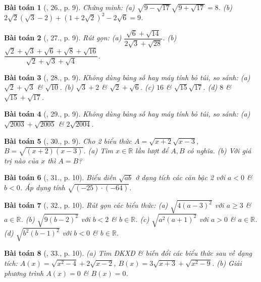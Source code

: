 \documentclass{article}
\newtheorem{baitoan}{Bài toán}
\begin{document}
\begin{baitoan}[\cite{SBT_Toan_9_tap_1}, 26., p. 9]
	Chứng minh: (a) $\sqrt{9 - \sqrt{17}}\sqrt{9 + \sqrt{17}} = 8$. (b) $2\sqrt{2}(\sqrt{3} - 2) + (1 + 2\sqrt{2})^2 - 2\sqrt{6} = 9$.
\end{baitoan}

\begin{baitoan}[\cite{SBT_Toan_9_tap_1}, 27., p. 9]
	Rút gọn: (a) $\dfrac{\sqrt{6} + \sqrt{14}}{2\sqrt{3} + \sqrt{28}}$. (b) $\dfrac{\sqrt{2} + \sqrt{3} + \sqrt{6} + \sqrt{8} + \sqrt{16}}{\sqrt{2} + \sqrt{3} + \sqrt{4}}$.
\end{baitoan}

\begin{baitoan}[\cite{SBT_Toan_9_tap_1}, 28., p. 9]
	Không dùng bảng số hay máy tính bỏ túi, so sánh: (a) $\sqrt{2} + \sqrt{3}$ \& $\sqrt{10}$. (b) $\sqrt{3} + 2$ \& $\sqrt{2} + \sqrt{6}$. (c) $16$ \& $\sqrt{15}\sqrt{17}$. (d) $8$ \& $\sqrt{15} + \sqrt{17}$.
\end{baitoan}

\begin{baitoan}[\cite{SBT_Toan_9_tap_1}, 29., p. 9]
	Không dùng bảng số hay máy tính bỏ túi, so sánh: (a) $\sqrt{2003} + \sqrt{2005}$ \& $2\sqrt{2004}$.
\end{baitoan}

\begin{baitoan}[\cite{SBT_Toan_9_tap_1}, 30., p. 9]
	Cho 2 biểu thức $A = \sqrt{x + 2}\sqrt{x - 3}$, $B = \sqrt{(x + 2)(x - 3)}$. (a) Tìm $x\in\mathbb{R}$ lần lượt để $A,B$  có nghĩa. (b) Với giá trị nào của $x$ thì $A = B$?
\end{baitoan}

\begin{baitoan}[\cite{SBT_Toan_9_tap_1}, 31., p. 10]
	Biểu diễn $\sqrt{ab}$ ở dạng tích các căn bậc 2 với $a < 0$ \& $b < 0$. Áp dụng tính $\sqrt{(-25)\cdot(-64)}$.
\end{baitoan}

\begin{baitoan}[\cite{SBT_Toan_9_tap_1}, 32., p. 10]
	Rút gọn các biểu thức: (a) $\sqrt{4(a - 3)^2}$ với $a\ge3$ \& $a\in\mathbb{R}$. (b) $\sqrt{9(b - 2)^2}$ với $b < 2$ \& $b\in\mathbb{R}$. (c) $\sqrt{a^2(a + 1)^2}$ với $a > 0$ \& $a\in\mathbb{R}$. (d) $\sqrt{b^2(b - 1)^2}$ với $b < 0$ \& $b\in\mathbb{R}$.
\end{baitoan}

\begin{baitoan}[\cite{SBT_Toan_9_tap_1}, 33., p. 10]
	(a) Tìm ĐKXĐ \& biến đổi các biểu thức sau về dạng tích: $A(x) = \sqrt{x^2 - 4} + 2\sqrt{x - 2}$, $B(x) = 3\sqrt{x + 3} + \sqrt{x^2 - 9}$. (b) Giải phương trình $A(x) = 0$ \& $B(x) = 0$.
\end{baitoan}
\end{document}
